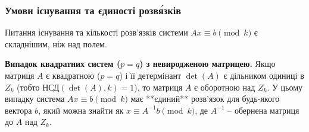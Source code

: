 \documentclass[a4paper,12pt]{article}
\begin{document}
    \subsubsection{Умови існування та єдиності розв\'язків} %
    Питання існування та кількості розв'язків системи \(Ax \equiv b \pmod k\) є складнішим, ніж над полем.

    \textbf{Випадок квадратних систем (\(p=q\)) з невиродженою матрицею.} Якщо матриця \(A\) є квадратною (\(p=q\)) і її детермінант \(\det(A)\) є дільником одиниці в \(Z_k\) (тобто НСД\((\det(A), k) = 1\)), то матриця \(A\) є оборотною над \(Z_k\). У цьому випадку система \(Ax \equiv b \pmod k\) має **єдиний** розв'язок для будь-якого вектора \(b\), який можна знайти як \(x \equiv A^{-1}b \pmod k\), де \(A^{-1}\) -- обернена матриця до \(A\) над \(Z_k\).
\end{document}

